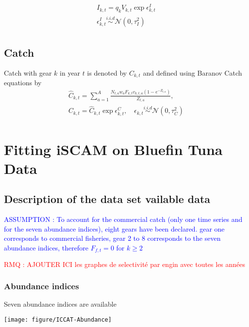 \documentclass[a4paper]{article}\usepackage{graphicx, color}
\makeatletter
\def\maxwidth{ %
  \ifdim\Gin@nat@width>\linewidth
    \linewidth
  \else
    \Gin@nat@width
  \fi
}
\newenvironment{knitrout}{}{} %
\newcommand{\RMQ}[1]{\par \hspace{-2cm}\textcolor{red}{RMQ : #1 }\par }
\newcommand{\ASS}[1]{\par \textcolor{blue}{ASSUMPTION : #1}\par}
\makeatother
\begin{document}
 
\begin{gather}
I_{k,t} = q_k V_{k,t} \exp{\epsilon_{k,t}^I}\\
\epsilon_{k,t}^I \overset{i.i.d}{\sim} \mathcal{N}(0,\tau_I^2)\\
\end{gather}
\subsection{Catch}
Catch  with  gear  $k$  in  year  $t$  is  denoted  by  $C_{k,t}$  and
defined using Baranov Catch equations by
\begin{gather}
\hat{C}_{k,t}   =   \sum_{a=1}^A   \frac{N_{t,a}   w_a   F_{k,t}   v_{k,t,a}
  (1-e^{-Z_{t,a}}) }{Z_{t,a}},\\
C_{k,t} = \hat{C}_{k,t} \exp{\epsilon_{k,t}^C}, \quad \epsilon_{k,t}\overset{i.i.d}{\sim}\mathcal{N}(0, \tau^2_C)\\
\end{gather}



\section{Fitting iSCAM on Bluefin Tuna Data}

\subsection{Description of the data set vailable data}
\ASS{To account  for the commercial  catch (only one time  series and
for the seven abundance indices),  eight gears have been declared. gear
one corresponds  to commercial fisheries,  gear 2 to 8  corresponds to
the seven abundance indices, therefore $F_{f,t}=0$ for $k \geq 2$}


\RMQ{AJOUTER ICI les graphes de selectivité par engin avec toutes les années}


\subsubsection{Abundance indices}
Seven abundance indices are available 
\begin{knitrout}
\color{fgcolor}

{\centering \texttt{[image: figure/ICCAT-Abundance]} 

}



\end{knitrout}
\end{document}
